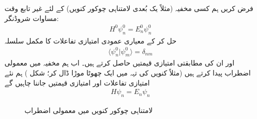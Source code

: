 
فرض کریں ہم کسی مخفیہ (مثلاً یک بُعدی لامتناہی چوکور کنویں) کے لئے غیر تابع وقت مساوات شروڈنگر:
\begin{align}\label{مساوات_اضطراب_پہلی}
H^0\psi_n^0=E_n^0\psi_n^0
\end{align}
حل کر کے معیاری عمودی امتیازی تفاعلات  کا مکمل سلسلہ
\begin{align}
\langle \psi_n^0 | \psi_m^0 \rangle = \delta_{nm}
\end{align}
اور ان کی مطابقتی امتیازی قیمتیں  حاصل کرتے ہیں۔ اب ہم مخفیہ میں معمولی اضطراب پیدا کرتے ہیں (مثلاً کنویں کی تہہ میں ایک چھوٹا موڑا ڈال کر؛ شکل ) ہم نئے امتیازی تفاعلات اور امتیازی قیمتیں جاننا چاہیں گے
\begin{align}\label{مساوات_اضطراب_بنیادی}
H\psi_n = E_n\psi_n
\end{align}
%
\begin{figure}
\centering
{}
\caption{لامتناہی چوکور کنویں میں معمولی اضطراب}
\label{شکل_غیر_تابع_اضطراب_چکور_معمولی}
\end{figure}


